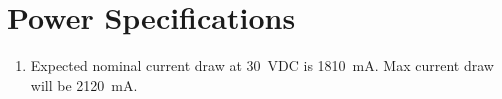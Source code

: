 \newpage
\section{Power Specifications}
\label{sec:Power}

\hspace*{0.5cm}
\begin{minipage}{\linewidth-0.5cm}
  \begin{enumerate}[label=\Alph*.]
  \item Expected nominal current draw at \SI{30}{\volt}DC is \SI{1810}{\milli\ampere}. Max current draw will be \SI{2120}{\milli\ampere}.  
  \end{enumerate}
\end{minipage}
